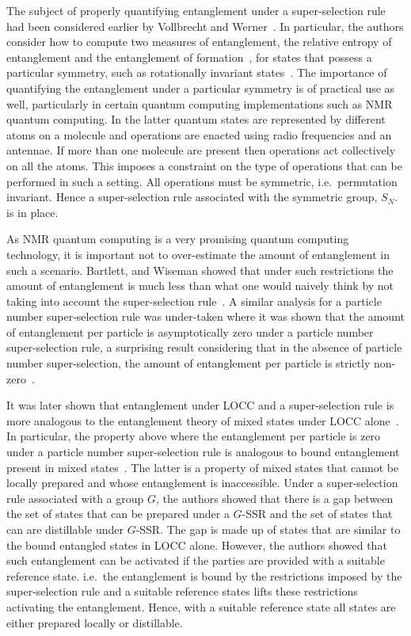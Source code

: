 \documentclass{article}
\begin{document}
The subject of properly quantifying entanglement under a super-selection rule had been considered earlier by Vollbrecht and Werner~\cite{VW01}.  In particular, the authors consider how to compute two measures of entanglement, the relative entropy of entanglement and the entanglement of formation~\cite{BDSW96}, for states that possess a particular symmetry, such as rotationally invariant states~\cite{W89}.  The importance of quantifying the entanglement under a particular symmetry is of practical use as well, particularly in certain quantum computing implementations such as NMR quantum computing.  In the latter quantum states are represented by different atoms on a molecule and operations are enacted using radio frequencies and an antennae.  If more than one molecule are present then operations act collectively on all the atoms.  This imposes a constraint on the type of operations that can be performed in such a setting.  All operations must be symmetric, i.e.~permutation invariant.  Hence a super-selection rule associated with the symmetric group, $S_N$. is in place.  

As NMR quantum computing is a very promising quantum computing technology, it is important not to over-estimate the amount of entanglement in such a scenario.  Bartlett, and Wiseman showed that under such restrictions the amount of entanglement is much less than what one would naively think by not taking into account the super-selection rule~\cite{BW03, WBV03}.  A similar analysis for a particle number super-selection rule was under-taken where it was shown that the amount of entanglement per particle is asymptotically zero under a particle number super-selection rule, a surprising result considering that in the absence of particle number super-selection, the amount of entanglement per particle is strictly non-zero~\cite{WV03,WBV03}.     

It was later shown that entanglement under LOCC and a super-selection rule is more analogous to the entanglement theory of mixed states under LOCC alone~\cite{BDSW06,JWBVP06}.  In particular, the property above where the entanglement per particle is zero under a particle number super-selection rule is analogous to bound entanglement present in mixed states~\cite{HHH98}.  The latter is a property of mixed states that cannot be locally prepared and whose entanglement is inaccessible.  Under a super-selection rule associated with a group $G$, the authors showed that there is a gap between the set of states that can be prepared under a $G$-SSR and the set of states that can are distillable under $G$-SSR.  The gap is made up of states that are similar to the bound entangled states in LOCC alone.  However, the authors showed that such entanglement can be activated if the parties are provided with a suitable reference state. i.e.~the entanglement is bound by the restrictions imposed by the super-selection rule and a suitable reference states lifts these restrictions activating the entanglement.  Hence, with a suitable reference state all states are either prepared locally or distillable.   
 
\end{document}
